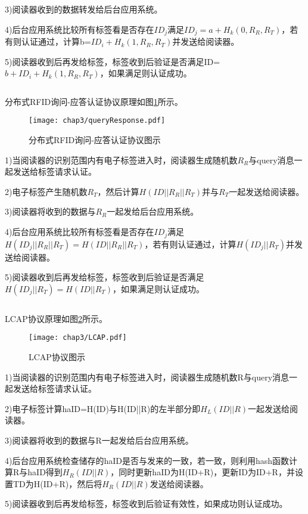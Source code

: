 3)阅读器收到的数据转发给后台应用系统。

4)后台应用系统比较所有标签看是否存在$ID_{j}$满足$ID_{j}=a+H_{k}(0,R_{R},R_{T})$，若有则认证通过，计算b=$ID_{i}+H_{k}(1,R_{R},R_{T})$并发送给阅读器。

5)阅读器收到后再发给标签，标签收到后验证是否满足ID=$b+ID_{i}+H_{k}(1,R_{R},R_{T})$，如果满足则认证成功。

\[\]

分布式RFID询问-应答认证协议原理如图\ref{fig:分布式RFID询问-应答认证协议图示}所示。

\begin{figure}[!htp]
	\centering
	\texttt{[image: chap3/queryResponse.pdf]}
	\caption{分布式RFID询问-应答认证协议图示}\label{fig:分布式RFID询问-应答认证协议图示}
\end{figure}

1)当阅读器的识别范围内有电子标签进入时，阅读器生成随机数$R_{R}$与query消息一起发送给标签请求认证。

2)电子标签产生随机数$R_{T}$，然后计算$H(ID||R_{R}||R_{T})$并与$R_{T}$一起发送给阅读器。

3)阅读器将收到的数据与$R_{R}$一起发给后台应用系统。

4)后台应用系统比较所有标签看是否存在$ID_{j}$满足$H(ID_{j}||R_{R}||R_{T})=H(ID||R_{R}||R_{T})$，若有则认证通过，计算$H(ID_{j}||R_{T})$并发送给阅读器。

5)阅读器收到后再发给标签，标签收到后验证是否满足$H(ID_{j}||R_{T})=H(ID||R_{T})$，如果满足则认证成功。

\[\]

LCAP协议原理如图\ref{fig:LCAP协议图示}所示。

\begin{figure}[!htp]
	\centering
	\texttt{[image: chap3/LCAP.pdf]}
	\caption{LCAP协议图示}\label{fig:LCAP协议图示}
\end{figure}

1)当阅读器的识别范围内有电子标签进入时，阅读器生成随机数R与query消息一起发送给标签请求认证。

2)电子标签计算haID=H(ID)与H(ID||R)的左半部分即$H_{L}(ID||R)$一起发送给阅读器。

3)阅读器将收到的数据与R一起发给后台应用系统。

4)后台应用系统检查储存的haID是否与发来的一致，若一致，则利用hash函数计算R与haID得到$H_{R}(ID||R)$，同时更新haID为H(ID+R)，更新ID为ID+R，并设置TD为H(ID+R)，然后将$H_{R}(ID||R)$发送给阅读器。

5)阅读器收到后再发给标签，标签收到后验证有效性，如果成功则认证成功。

